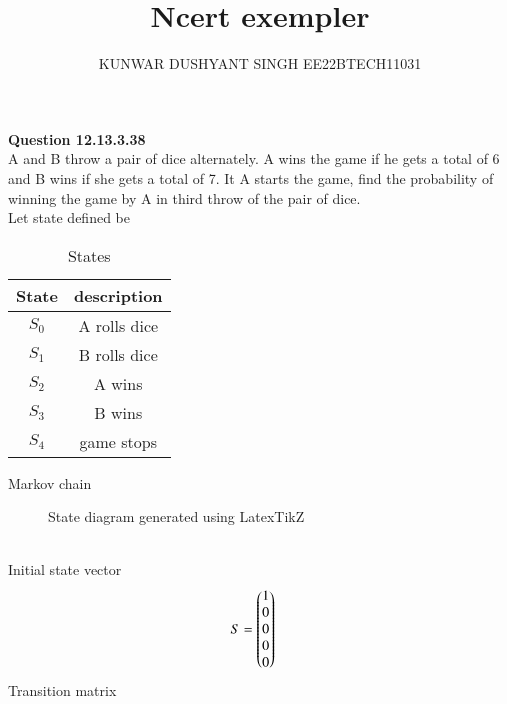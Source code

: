 \documentclass[journal,12pt,twocolumn]{IEEEtran}
\begin{document}



\vspace{3cm}

\title{
Ncert exempler
}
\author{ KUNWAR DUSHYANT SINGH EE22BTECH11031}


\maketitle

\newpage

\maketitle
\textbf{Question 12.13.3.38}\\
A and B throw a pair of dice alternately. A wins the game if he gets a total of
6 and B wins if she gets a total of 7. It A starts the game, find the probability of
winning the game by A in third throw of the pair of dice.\\
\solution
Let state defined be
\begin{table}[H]
\begin{tabular}{|c|c|}
\hline
State &description \\ \hline
 $S_0$ & A rolls dice\\ \hline
 $S_1$ & B rolls dice\\\hline
 $S_2$ & A wins\\\hline
 $S_3$ & B wins\\\hline
 $S_4$  & game stops\\\hline
\end{tabular}
\caption{States}
\label{tab:exemplar/12/13/3/38}
\end{table}
Markov chain\\
\begin{figure}[ht!]
    \centering
    \resizebox{\linewidth}{!}{}
    \caption{State diagram generated using LatexTikZ}
    \label{fig:Statediagramdiecoin}
\end{figure}
\\
Initial state vector\\
\begin{align}
S &= \begin{pmatrix} 1\\ 0\\0\\0\\0\\\end{pmatrix}
\end{align}
Transition matrix\\
\end{document}
